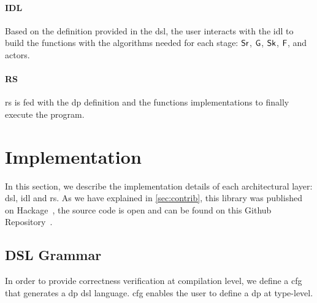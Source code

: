 \paragraph{IDL} Based on the definition provided in the \acrshort{dsl}, the user interacts with the \acrshort{idl} to build the functions with the algorithms needed for each stage: $\mathsf{Sr}$, $\mathsf{G}$, $\mathsf{Sk}$, $\mathsf{F}$, and actors. 

\paragraph{RS} \acrshort{rs} is fed with the \acrshort{dp} definition and the functions implementations to finally execute the program. 

\section{Implementation}
In this section, we describe the implementation details of each architectural layer: \acrshort{dsl}, \acrshort{idl} and \acrshort{rs}.
As we have explained in \autoref{sec:contrib}, this library was published on Hackage~\cite{dynamic-pipeline}, the source code is open and can be found on this Github Repository~\cite{dynamic-pipeline-git}.

\subsection{DSL Grammar}\label{sub:sec:dsl-gram}
In order to provide correctness verification at compilation level, we define a \acrfull{cfg} that generates a \acrshort{dp} \acrshort{dsl} language. 
\acrshort{cfg} enables the user to define a \acrshort{dp} at type-level. 

